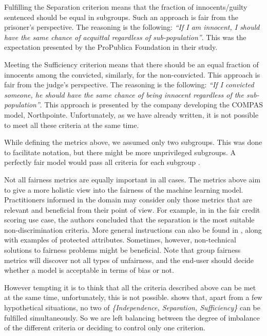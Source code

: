 Fulfilling the Separation criterion means that the fraction of
innocents/guilty sentenced should be equal in subgroups. Such an
approach is fair from the prisoner's perspective. The reasoning is the
following: \emph{``If I am innocent, I should have the same chance of
acquittal regardless of sub-population''}. This was the expectation
presented by the ProPublica Foundation in their study.

Meeting the Sufficiency criterion means that there should be an equal
fraction of innocents among the convicted, similarly, for the
non-convicted. This approach is fair from the judge's perspective. The
reasoning is the following: \emph{``If I convicted someone, he should
have the same chance of being innocent regardless of the
sub-population''}. This approach is presented by the company developing
the COMPAS model, Northpointe. Unfortunately, as we have already
written, it is not possible to meet all these criteria at the same time.

While defining the metrics above, we assumed only two subgroups. This
was done to facilitate notation, but there might be more unprivileged
subgroups. A perfectly fair model would pass all criteria for each
subgroup \citep{barocas-hardt-narayanan}.

Not all fairness metrics are equally important in all cases. The metrics
above aim to give a more holistic view into the fairness of the machine
learning model. Practitioners informed in the domain may consider only
those metrics that are relevant and beneficial from their point of view.
For example, in \citet{KOZODOI2021} in the fair credit scoring use case,
the authors concluded that the separation is the most suitable
non-discrimination criteria. More general instructions can also be found
in \citet{EUhandbook}, along with examples of protected attributes.
Sometimes, however, non-technical solutions to fairness problems might
be beneficial. Note that group fairness metrics will discover not all
types of unfairness, and the end-user should decide whether a model is
acceptable in terms of bias or not.

However tempting it is to think that all the criteria described above
can be met at the same time, unfortunately, this is not possible.
\citet{barocas-hardt-narayanan} shows that, apart from a few
hypothetical situations, no two of \emph{\{Independence, Separation,
Sufficiency\}} can be fulfilled simultaneously. So we are left balancing
between the degree of imbalance of the different criteria or deciding to
control only one criterion.


